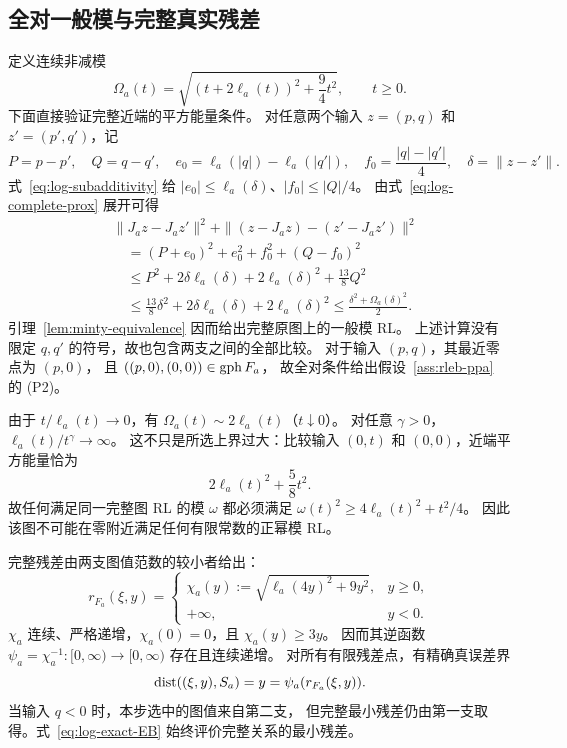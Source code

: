 \subsection{全对一般模与完整真实残差}

定义连续非减模
\begin{equation}
\label{eq:log-RL-modulus}
 \Omega_a(t)=\sqrt{(t+2\ell_a(t))^2+\frac94t^2},\qquad t\ge0.
\end{equation}
下面直接验证完整近端的平方能量条件。
对任意两个输入 $z=(p,q)$ 和 $z'=(p',q')$，记
\[
 P=p-p',\quad Q=q-q',\quad
 e_0=\ell_a(|q|)-\ell_a(|q'|),\quad
 f_0=\frac{|q|-|q'|}{4},\quad \delta=\|z-z'\|.
\]
式~\eqref{eq:log-subadditivity} 给
$|e_0|\le\ell_a(\delta)$、$|f_0|\le|Q|/4$。
由式~\eqref{eq:log-complete-prox} 展开可得
\begin{align*}
 &\|J_az-J_az'\|^2+
 \|(z-J_az)-(z'-J_az')\|^2\\
 &\quad=(P+e_0)^2+e_0^2+f_0^2+(Q-f_0)^2\\
 &\quad\le P^2+2\delta\ell_a(\delta)+2\ell_a(\delta)^2
               +\frac{13}{8}Q^2\\
 &\quad\le\frac{13}{8}\delta^2+2\delta\ell_a(\delta)+2\ell_a(\delta)^2
 \le\frac{\delta^2+\Omega_a(\delta)^2}{2}.
\end{align*}
引理~\ref{lem:minty-equivalence} 因而给出完整原图上的一般模 RL。
上述计算没有限定 $q,q'$ 的符号，故也包含两支之间的全部比较。
对于输入 $(p,q)$，其最近零点为 $(p,0)$，
且 $((p,0),(0,0))\in\operatorname{gph} F_a$，
故全对条件给出假设~\ref{ass:rleb-ppa} 的 (P2)。

由于 $t/\ell_a(t)\to0$，有 $\Omega_a(t)\sim2\ell_a(t)$（$t\downarrow0$）。
对任意 $\gamma>0$，$\ell_a(t)/t^\gamma\to\infty$。
这不只是所选上界过大：比较输入 $(0,t)$ 和 $(0,0)$，近端平方能量恰为
\[
 2\ell_a(t)^2+\frac58t^2.
\]
故任何满足同一完整图 RL 的模 $\omega$ 都必须满足
$\omega(t)^2\ge4\ell_a(t)^2+t^2/4$。
因此该图不可能在零附近满足任何有限常数的正幂模 RL。

完整残差由两支图值范数的较小者给出：
\begin{equation}
\label{eq:log-true-residual}
 r_{F_a}(\xi,y)=
 \begin{cases}
 \chi_a(y):=\sqrt{\ell_a(4y)^2+9y^2},&y\ge0,\\
 +\infty,&y<0.
 \end{cases}
\end{equation}
$\chi_a$ 连续、严格递增，$\chi_a(0)=0$，且 $\chi_a(y)\ge3y$。
因而其逆函数 $\psi_a=\chi_a^{-1}:[0,\infty)\to[0,\infty)$ 存在且连续递增。
对所有有限残差点，有精确真误差界
\begin{equation}
\label{eq:log-exact-EB}
 \operatorname{dist}((\xi,y),S_a)=y=\psi_a(r_{F_a}(\xi,y)).
\end{equation}
当输入 $q<0$ 时，本步选中的图值来自第二支，
但完整最小残差仍由第一支取得。式~\eqref{eq:log-exact-EB}
始终评价完整关系的最小残差。

